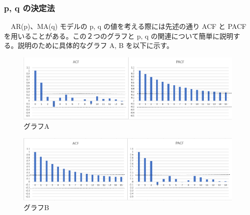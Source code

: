 \documentclass{scrartcl}
\begin{document}
\subsubsection{p, q の決定法}
\label{sec:org74d7334}
　AR(p)、MA(q) モデルの p, q の値を考える際には先述の通り ACF と PACF を用いることがある。この２つのグラフと p, q の関連について簡単に説明する。説明のために具体的なグラフ A, B を以下に示す。\\
\begin{figure}[htbp]
\centering
\includegraphics[width=16cm]{./acf-pacf.PNG}
\caption{グラフA}
\end{figure}

\begin{figure}[htbp]
\centering
\includegraphics[width=16cm]{./pacf-acf.PNG}
\caption{グラフB}
\end{figure}
\end{document}

